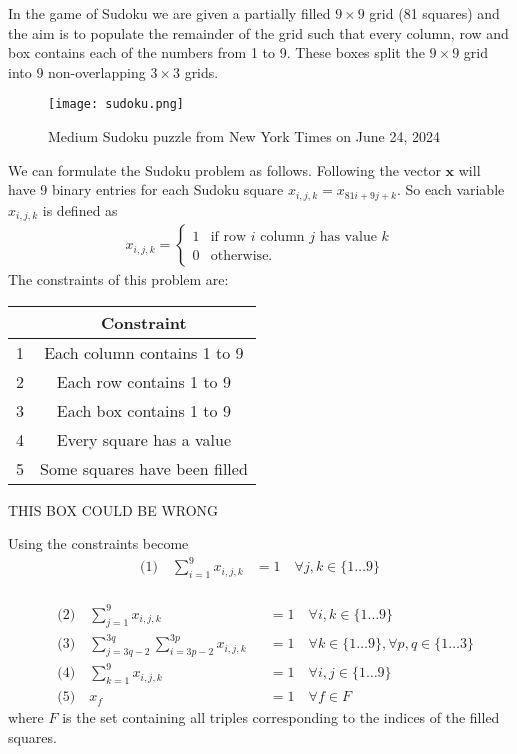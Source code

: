 \documentclass{article}
\begin{document}
In the game of Sudoku we are given a partially filled \(9 \times 9\) grid (81 squares) and the aim is to populate the remainder of the grid such that every column, row and box contains each of the numbers from 1 to 9. These boxes split the \(9 \times 9\) grid into 9 non-overlapping \(3 \times 3\) grids.

\begin{figure}[H]
    \centering
    \texttt{[image: sudoku.png]}
    \caption{Medium Sudoku puzzle from New York Times on June 24, 2024}
    \label{fig:Sudoku 1}
\end{figure}

\noindent We can formulate the Sudoku problem as follows. Following \cite[p.~1]{mücke2024sudoku} the vector \(\mathbf{x}\) will have 9 binary entries for each Sudoku square \(x_{i,j,k} = x_{81i + 9j + k}\). So each variable \(x_{i,j,k}\) is defined as
\begin{align*}
    x_{i,j,k} = \begin{cases}
        1 & \text{if row \(i\) column \(j\) has value \(k\)} \\
        0 & \text{otherwise.}
    \end{cases}
\end{align*}
The constraints of this problem are:
\begin{center}
\begin{tabular}{ |c|c| } 
 \hline
   & Constraint\\ 
 \hline
 1 & Each column contains 1 to 9\\ 
 2 & Each row contains 1 to 9\\
 3 & Each box contains 1 to 9\\
 4 & Every square has a value\\
 5 & Some squares have been filled\\
 \hline
\end{tabular}
\end{center}
THIS BOX COULD BE WRONG

\noindent Using \cite[p.~326]{ILPsudoku} the constraints become
\begin{equation*}
\begin{aligned} 
\text{(1)} \quad \sum_{i=1}^9 x_{i,j,k} &= 1\quad \forall j,k \in \{1 \dots 9\} \\
\end{aligned}
\end{equation*}


\begin{equation*}
\begin{aligned} 
&\text{(2)} \quad \sum_{j=1}^9 x_{i,j,k} &&= 1\quad \forall i,k \in \{1 \dots 9\} \\
&\text{(3)} \quad \sum_{j=3q-2}^{3q} \sum_{i=3p-2}^{3p} x_{i,j,k} &&= 1\quad \forall k \in \{1 \dots 9\}, \forall p,q \in \{1 \dots 3\}\\
&\text{(4)} \quad \sum_{k=1}^9 x_{i,j,k} &&= 1\quad \forall i,j \in \{1 \dots 9\} \\
&\text{(5)} \quad x_f &&= 1\quad \forall f \in F
\end{aligned}
\end{equation*}
where \(F\) is the set containing all triples corresponding to the indices of the filled squares. \\
\end{document}
